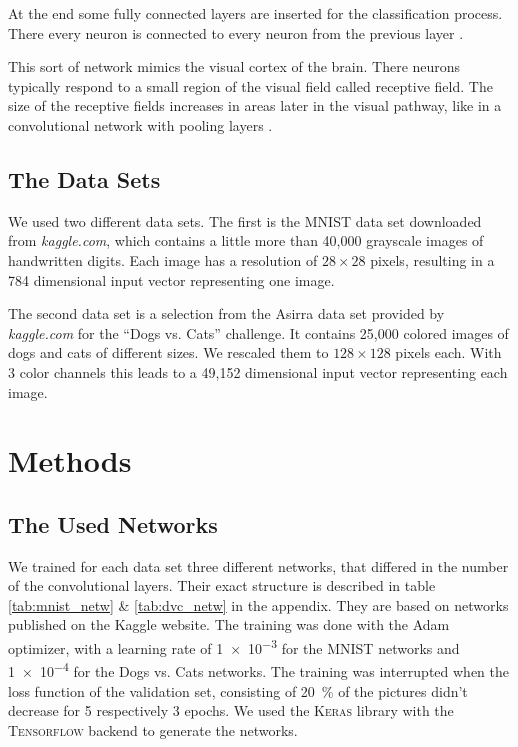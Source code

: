 \documentclass[%
 reprint,
 amsmath,amssymb,
 aps,
]{revtex4-1}
\begin{document}
At the end some fully connected layers are inserted for the classification process. There every neuron is connected to every neuron from the previous layer \cite{Goodfellow-et-al-2016}.

This sort of network mimics the visual cortex of the brain. There neurons typically respond to a small region of the visual field called receptive field. The size of the receptive fields increases in areas later in the visual pathway, like in a convolutional network with pooling layers \cite{visualCortex}.

\subsection{The Data Sets}

We used two different data sets. The first is the MNIST data set downloaded from \emph{kaggle.com}, which contains a little more than 40,000 grayscale images of handwritten digits. Each image has a resolution of $28\times 28$ pixels, resulting in a 784 dimensional input vector representing one image. 

The second data set is a selection from the Asirra data set provided by \emph{kaggle.com} for the ``Dogs vs. Cats'' challenge. It contains 25,000 colored images of dogs and cats of different sizes. We rescaled them to $128\times 128$ pixels each. With 3 color channels this leads to a 49,152 dimensional input vector representing each image. 
\section{Methods}

\subsection{The Used Networks}

We trained for each data set three different networks, that differed in the number of the convolutional layers. Their exact structure is described in table \ref{tab:mnist_netw} \& \ref{tab:dvc_netw} in the appendix. They are based on networks published on the Kaggle website. The training was done with the Adam optimizer, with a learning rate of \SI{1e-3}{} for the MNIST networks and \SI{1e-4}{} for the Dogs vs. Cats networks. The training was interrupted when the loss function of the validation set, consisting of \SI{20}{\percent} of the pictures didn't decrease for 5 respectively 3 epochs. 
We used the \textsc{Keras} library with the \textsc{Tensorflow} backend to generate the networks.
\end{document}
